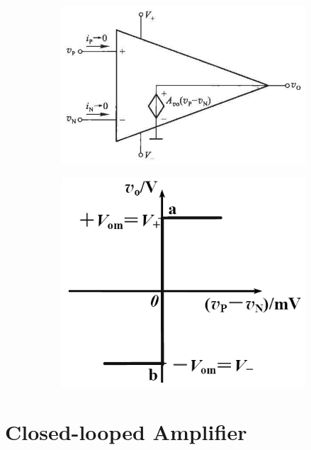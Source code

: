 \begin{figure}[H]
  \centering
  \begin{subfigure}{.6\textwidth}
    \centering
    \includegraphics[width=\linewidth]{figures/ideal-comparator}
  \end{subfigure}
  \begin{subfigure}{.35\textwidth}
    \centering
    \includegraphics[width=\linewidth]{figures/ideal-comparator-2}
  \end{subfigure}
\end{figure}

\section{Closed-looped Amplifier}

